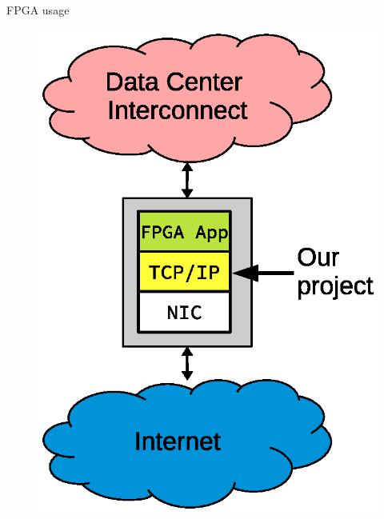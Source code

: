 \begin{frame}
FPGA usage
\begin{figure}
	\centering
\includegraphics[scale=0.5]{./background/fpga_usage.eps}
\end{figure}
\end{frame}


